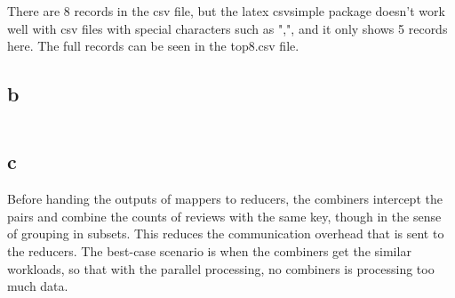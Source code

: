 \documentclass[12pt]{report}
\begin{document}
There are 8 records in the csv file, but the latex csvsimple package doesn't work well with csv files with special characters such as ",", and it only shows 5 records here. The full records can be seen in the top8.csv file.

    	\subsection{b}
\inputminted[fontsize=\tiny]{python}{ distributed_data_processing/haters.py  }

          \subsection{c}
          Before handing the outputs of mappers to reducers, the combiners intercept the pairs and combine the counts of reviews with the same key, though in the sense of grouping in subsets. This reduces the communication overhead that is sent to the reducers. The best-case scenario is when the combiners get the similar workloads, so that with the parallel processing, no combiners is processing too much data.
\end{document}
